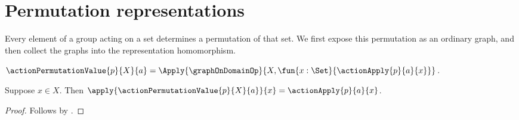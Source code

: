




\section{Permutation representations}

Every element of a group acting on a set determines a permutation of that
set.  We first expose this permutation as an ordinary graph, and then collect
the graphs into the representation homomorphism.

\begin{definition}\label{action_permutation_value}
    $\actionPermutationValue{p}{X}{a}=
        \Apply{\graphOnDomainOp}{
            X,\fun{x:\Set}{\actionApply{p}{a}{x}}}$.
\end{definition}

\begin{proposition}\label{action_permutation_value_apply}
    Suppose $x\in X$.
    Then
        $\apply{\actionPermutationValue{p}{X}{a}}{x}
            =\actionApply{p}{a}{x}$.
\end{proposition}
\begin{proof}
    Follows by
        .
\end{proof}

